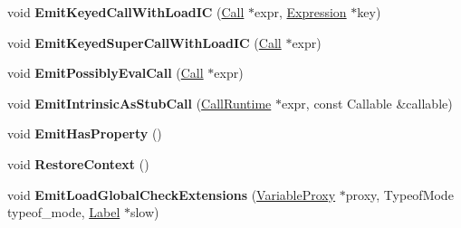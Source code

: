 \begin{DoxyCompactItemize}
\item 
void {\bfseries Emit\+Keyed\+Call\+With\+Load\+IC} (\hyperlink{classv8_1_1internal_1_1_call}{Call} $\ast$expr, \hyperlink{classv8_1_1internal_1_1_expression}{Expression} $\ast$key)\hypertarget{classv8_1_1internal_1_1_full_code_generator_a45c278bd3e60af508d249e5dffb129aa}{}\label{classv8_1_1internal_1_1_full_code_generator_a45c278bd3e60af508d249e5dffb129aa}

\item 
void {\bfseries Emit\+Keyed\+Super\+Call\+With\+Load\+IC} (\hyperlink{classv8_1_1internal_1_1_call}{Call} $\ast$expr)\hypertarget{classv8_1_1internal_1_1_full_code_generator_abed05aa6b3a519a769f94ee9fe4cc8c8}{}\label{classv8_1_1internal_1_1_full_code_generator_abed05aa6b3a519a769f94ee9fe4cc8c8}

\item 
void {\bfseries Emit\+Possibly\+Eval\+Call} (\hyperlink{classv8_1_1internal_1_1_call}{Call} $\ast$expr)\hypertarget{classv8_1_1internal_1_1_full_code_generator_a47fabc79773e1ddd4fcc09841e4ed644}{}\label{classv8_1_1internal_1_1_full_code_generator_a47fabc79773e1ddd4fcc09841e4ed644}

\item 
void {\bfseries Emit\+Intrinsic\+As\+Stub\+Call} (\hyperlink{classv8_1_1internal_1_1_call_runtime}{Call\+Runtime} $\ast$expr, const Callable \&callable)\hypertarget{classv8_1_1internal_1_1_full_code_generator_aa7d72c6dcca86b1ba2822c04c496cadf}{}\label{classv8_1_1internal_1_1_full_code_generator_aa7d72c6dcca86b1ba2822c04c496cadf}

\item 
void {\bfseries Emit\+Has\+Property} ()\hypertarget{classv8_1_1internal_1_1_full_code_generator_adb9d9dee87638bca754632d07bd23cbb}{}\label{classv8_1_1internal_1_1_full_code_generator_adb9d9dee87638bca754632d07bd23cbb}

\item 
void {\bfseries Restore\+Context} ()\hypertarget{classv8_1_1internal_1_1_full_code_generator_a72ee4fc2e4065c3d7ba19f5760aab44b}{}\label{classv8_1_1internal_1_1_full_code_generator_a72ee4fc2e4065c3d7ba19f5760aab44b}

\item 
void {\bfseries Emit\+Load\+Global\+Check\+Extensions} (\hyperlink{classv8_1_1internal_1_1_variable_proxy}{Variable\+Proxy} $\ast$proxy, Typeof\+Mode typeof\+\_\+mode, \hyperlink{classv8_1_1internal_1_1_label}{Label} $\ast$slow)\hypertarget{classv8_1_1internal_1_1_full_code_generator_a992be366e8b73aef23d7f919250a4315}{}\label{classv8_1_1internal_1_1_full_code_generator_a992be366e8b73aef23d7f919250a4315}


\end{DoxyCompactItemize}
